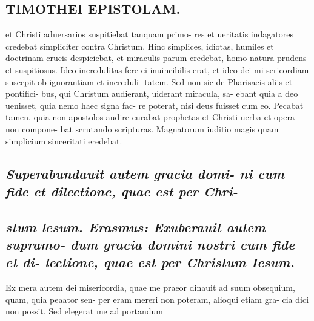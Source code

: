\documentclass{article}
\begin{document}
\begin{pages}
\section*{TIMOTHEI EPISTOLAM. }
\marginpar{[ p.29 ]}\pstart et Christi aduersarios suspitiebat tanquam primo- res et ueritatis indagatores credebat simpliciter contra Christum. Hinc simplices, idiotas, humiles et doctrinam crucis despiciebat, et miraculis parum credebat, homo natura prudens et suspitiosus. Ideo incredulitas fere ei inuincibilis erat, et idco dei mi sericordiam suscepit ob ignorantiam et increduli- tatem. Sed non sic de Pharisaeis aliis et pontifici- bus, qui Christum audierant, uiderant miracula, sa- ebant quia a deo uenisset, quia nemo haec signa fac- re poterat, nisi deus fuisset cum eo.  \pend\pstart Pecabat tamen, quia non apostolos audire curabat prophetas et Christi uerba et opera non compone- bat scrutando scripturas. Magnatorum iuditio magis quam simplicium sinceritati eredebat.  \pend
{}
{}
\subsection*{\textit{Superabundauit autem gracia domi- ni cum fide et dilectione, quae est per Chri- }}
{}
\subsection*{\textit{stum lesum. Erasmus: Exuberauit autem supramo- dum gracia domini nostri cum fide et di- lectione, quae est per Christum Iesum. }}\pstart Ex mera autem dei misericordia, quae me praeor dinauit ad suum obsequium, quam, quia peaator sen- per eram mereri non poteram, alioqui etiam gra- cia dici non possit. Sed elegerat me ad portandum  \pend

\end{pages}
\end{document}
